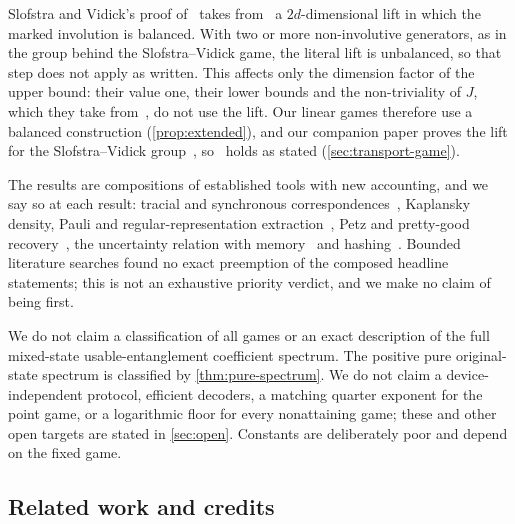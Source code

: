 Slofstra and Vidick's proof of~\cite[Proposition~6.2]{SV18} takes from~\cite[Proposition~4.8]{Slo19} a $2d$-dimensional lift in
which the marked involution is balanced. With two or more non-involutive generators, as in the group behind the Slofstra--Vidick game, the literal
lift is unbalanced, so that step does not apply as written. This affects only the dimension factor of the upper bound: their value
one, their lower bounds and the non-triviality of $J$, which they take from~\cite[Lemma~5.2]{Slo19}, do not use the lift. Our
linear games therefore use a balanced construction (\cref{prop:extended}), and our companion paper proves the lift for the
Slofstra--Vidick group~\cite[Lemma~11.13]{DM-game}, so~\cite[Theorem~1.1]{SV18} holds as stated (\cref{sec:transport-game}).

The results are compositions of established tools with new accounting, and we say so at each result: tracial and synchronous
correspondences~\cite{CM14,PSSTW16,KPS18}, Kaplansky density, Pauli and regular-representation extraction~\cite{GH17,NV17},
Petz and pretty-good recovery~\cite{Petz86,BK02,BCW14,IRS17,Ren17}, the uncertainty relation with memory~\cite{BCCRR10} and hashing~\cite{DW05,BDSW96}.
Bounded literature searches found no exact preemption of the composed headline statements; this is not an exhaustive priority
verdict, and we make no claim of being first.

We do not claim a classification of all games or an exact description of the full mixed-state usable-entanglement coefficient spectrum. The positive pure original-state spectrum is classified by \cref{thm:pure-spectrum}. We do not claim a device-independent protocol,
efficient decoders, a matching quarter exponent for the point game, or a logarithmic floor for every nonattaining game; these and
other open targets are stated in
\cref{sec:open}. Constants are deliberately poor and depend on the fixed game.

\subsection{Related work and credits}\label{sec:intro-related}

